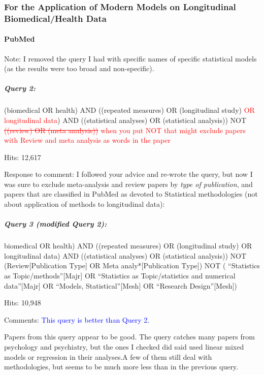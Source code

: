 \documentclass[
]{article}
\let\oldparagraph\paragraph
\renewcommand{\paragraph}[1]{\oldparagraph{#1}\mbox{}}
\let\oldsubparagraph\subparagraph
\renewcommand{\subparagraph}[1]{\oldsubparagraph{#1}\mbox{}}
\newcommand{\BN}[1]{\textcolor{red}{#1}}
\begin{document}
\hypertarget{for-the-application-of-modern-models-on-longitudinal-biomedicalhealth-data}{%
\subsubsection{For the Application of Modern Models on Longitudinal
Biomedical/Health
Data}\label{for-the-application-of-modern-models-on-longitudinal-biomedicalhealth-data}}

\hypertarget{pubmed}{%
\paragraph{PubMed}\label{pubmed}}

Note: I removed the query I had with specific names of specific
statistical models (as the results were too broad and non-specific).

\hypertarget{query-2}{%
\subparagraph{Query 2:}\label{query-2}}

(biomedical OR health) AND ((repeated measures) OR (longitudinal study)
\BN{OR longitudinal data}) AND ((statistical analyses) OR (statistical
analysis)) NOT \BN{\sout{((review) OR
(meta analysis))}}
\BN{when you put NOT that might exclude papers with Review and meta analysis as words in the paper}

Hits: 12,617

Response to comment: I followed your advice and re-wrote the query, but
now I was sure to exclude meta-analysis and review papers by \emph{type
of publication}, and papers that are classified in PubMed as devoted to
Statistical methodologies (not about application of methods to
longitudinal data):

\hypertarget{query-3-modified-query-2}{%
\subparagraph{Query 3 (modified Query
2):}\label{query-3-modified-query-2}}

biomedical OR health) AND ((repeated measures) OR (longitudinal study)
OR longitudinal data) AND ((statistical analyses) OR (statistical
analysis)) NOT (Review{[}Publication Type{]} OR Meta
analy*{[}Publication Type{]}) NOT ( ``Statistics as
Topic/methods''{[}Majr{]} OR ``Statistics as Topic/statistics and
numerical data''{[}Majr{]} OR ``Models, Statistical''{[}Mesh{]} OR
``Research Design''{[}Mesh{]})

Hits: 10,948

Comments: \textcolor{blue}{This query is better than Query 2}.

Papers from this query appear to be good. The query catches many papers
from psychology and psychiatry, but the ones I checked did said used
linear mixed models or regression in their analyses.A few of them still
deal with methodologies, but seems to be much more less than in the
previous query.
\end{document}
